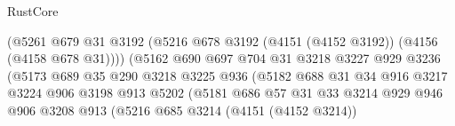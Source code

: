 \begin{lexlean}{RustCore}
\begin{coremodule}
                                        (@5261
                                          @679
                                          @31
                                          @3192
                                          (@5216
                                            @678
                                            @3192
                                            (@4151 (@4152 @3192))
                                            (@4156 (@4158 @678 @31))))
                                        (@5162
                                          @690
                                          @697
                                          @704
                                          @31
                                          @3218
                                          @3227
                                          @929
                                          @3236
                                          (@5173
                                            @689
                                            @35
                                            @290
                                            @3218
                                            @3225
                                            @936
                                            (@5182
                                              @688
                                              @31
                                              @34
                                              @916
                                              @3217
                                              @3224
                                              @906
                                              @3198
                                              @913
                                              @5202
                                              (@5181
                                                @686
                                                @57
                                                @31
                                                @33
                                                @3214
                                                @929
                                                @946
                                                @906
                                                @3208
                                                @913
                                                (@5216
                                                  @685
                                                  @3214
                                                  (@4151 (@4152 @3214))

\end{coremodule}
\end{lexlean}
